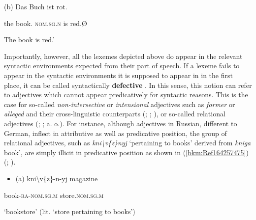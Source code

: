 \documentclass[output=paper]{langscibook}
\begin{document}
\begin{styleBeispielCinqueKapitel}
(b) Das Buch ist rot.
\end{styleBeispielCinqueKapitel}

\begin{styleBeispielCinqueKapitel}
the book. \textsc{nom.sg.n} is red.Ø
\end{styleBeispielCinqueKapitel}

\begin{styleBeispielCinqueKapitel}
{\textasciigrave}The book is red.’
\end{styleBeispielCinqueKapitel}

Importantly, however, all the lexemes depicted above do appear in the relevant syntactic environments expected from their part of speech. If a lexeme fails to appear in the syntactic environments it is supposed to appear in in the first place, it can be called syntactically \textbf{defective} \citep[143]{Spencer2020}. In this sense, this notion can refer to adjectives which cannot appear predicatively for syntactic reasons. This is the case for so-called \textit{non-intersective} or \textit{intensional} adjectives such as \textit{former} or \textit{alleged} and their cross-linguistic counterparts (\citealt{Bolinger1967}; \citealt{KampPartee1995}; \citealt{Larson1998}), or so-called relational adjectives (\citealt{Levi1978}; \citealt{Fábregas2007}; \citealt{Bortolotto2016} a. o.). For instance, although adjectives in Russian, different to German, inflect in attributive as well as predicative position, the group of relational adjectives, such as \textit{kni{\textbackslash}v\{z\}nyj} ‘pertaining to books’ derived from \textit{kniga} {\textasciigrave}book’, are simply illicit in predicative position as shown in (\ref{bkm:Ref164257475}) (\citealt{Mezhevich2002}; \citealt{Bailyn2002}).

\begin{itemize}
\item \begin{styleBeispielCinqueKapitel}
\label{bkm:Ref164257475}(a) kni{\textbackslash}v\{z\}-n-yj magazine
\end{styleBeispielCinqueKapitel}
\end{itemize}
\begin{styleBeispielCinqueKapitel}
book-\textsc{ra}{}-\textsc{nom.sg.m} store.\textsc{nom.sg.m}
\end{styleBeispielCinqueKapitel}

\begin{styleBeispielCinqueKapitel}
‘bookstore’ (lit. ‘store pertaining to books’)
\end{styleBeispielCinqueKapitel}
\end{document}

